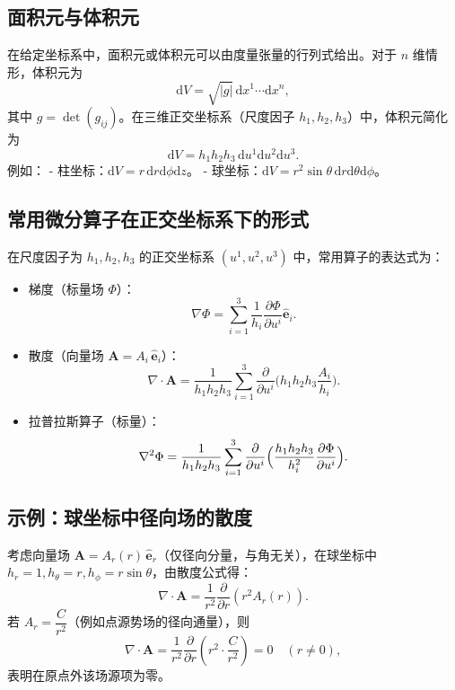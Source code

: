 \subsection{面积元与体积元}
在给定坐标系中，面积元或体积元可以由度量张量的行列式给出。对于 $n$ 维情形，体积元为
\[
\mathrm{d}V=\sqrt{|g|}\,\mathrm{d}x^{1}\cdots\mathrm{d}x^{n},
\]
其中 $g=\det(g_{ij})$。在三维正交坐标系（尺度因子 $h_1,h_2,h_3$）中，体积元简化为
\[
\mathrm{d}V=h_1h_2h_3\,\mathrm{d}u^1\mathrm{d}u^2\mathrm{d}u^3.
\]
例如：
- 柱坐标：$\mathrm{d}V=r\,\mathrm{d}r\mathrm{d}\phi\mathrm{d}z$。
- 球坐标：$\mathrm{d}V=r^2\sin\theta\,\mathrm{d}r\mathrm{d}\theta\mathrm{d}\phi$。

\subsection{常用微分算子在正交坐标系下的形式}
在尺度因子为 $h_1,h_2,h_3$ 的正交坐标系 $(u^1,u^2,u^3)$ 中，常用算子的表达式为：
\begin{itemize}
\item 梯度（标量场 $\Phi$）：
\[
\nabla\Phi=\sum_{i=1}^3 \frac{1}{h_i}\frac{\partial\Phi}{\partial u^i}\hat{\mathbf{e}}_i.
\]
\item 散度（向量场 $\mathbf{A}=A_i\,\hat{\mathbf{e}}_i$）：
\[
\nabla\cdot\mathbf{A}=\frac{1}{h_1h_2h_3}\sum_{i=1}^3 \frac{\partial}{\partial u^i}\bigl(h_1h_2h_3\frac{A_i}{h_i}\bigr).
\]
\item 拉普拉斯算子（标量）：
\[
\nabla^2\Phi=\frac{1}{h_1h_2h_3}\sum_{i=1}^3 \frac{\partial}{\partial u^i}\Bigl(\frac{h_1h_2h_3}{h_i^2}\frac{\partial\Phi}{\partial u^i}\Bigr).
\]
\end{itemize}

\subsection{示例：球坐标中径向场的散度}
考虑向量场 $\mathbf{A}=A_r(r)\,\hat{\mathbf{e}}_r$（仅径向分量，与角无关），在球坐标中 $h_r=1,h_\theta=r,h_\phi=r\sin\theta$，由散度公式得：
\[
\nabla\cdot\mathbf{A}=\frac{1}{r^2}\frac{\partial}{\partial r}(r^2 A_r(r)).
\]
若 $A_r=\dfrac{C}{r^2}$（例如点源势场的径向通量），则
\[
\nabla\cdot\mathbf{A}=\frac{1}{r^2}\frac{\partial}{\partial r}(r^2\cdot \frac{C}{r^2})=0\quad(r\neq0),
\]
表明在原点外该场源项为零。

